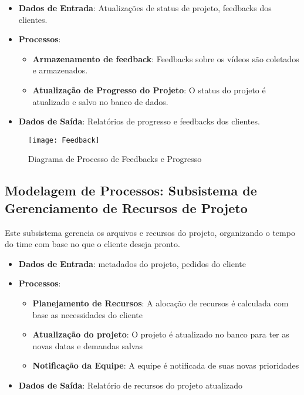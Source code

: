 \begin{itemize}
    \item \textbf{Dados de Entrada}: Atualizações de status de projeto, feedbacks dos clientes.
    \item \textbf{Processos}:
        \begin{itemize}
            \item \textbf{Armazenamento de feedback}: Feedbacks sobre os vídeos são coletados e armazenados.
            \item \textbf{Atualização de Progresso do Projeto}: O status do projeto é atualizado e salvo no banco de dados.
        \end{itemize}
    \item \textbf{Dados de Saída}: Relatórios de progresso e feedbacks dos clientes.
\end{itemize}

\begin{figure}[ht]
    \centering
    \texttt{[image: Feedback]}
    \caption{Diagrama de Processo de Feedbacks e Progresso}
    \label{fig:diagram1}
\end{figure}

\pagebreak
\newpage

\subsection{Modelagem de Processos: Subsistema de Gerenciamento de Recursos de Projeto}
Este subsistema gerencia os arquivos e recursos do projeto, organizando o tempo do time com base no que o cliente deseja pronto.

\begin{itemize}
    \item \textbf{Dados de Entrada}: metadados do projeto, pedidos do cliente
    \item \textbf{Processos}:
        \begin{itemize}
            \item \textbf{Planejamento de Recursos}: A alocação de recursos é calculada com base as necessidades do cliente
            \item \textbf{Atualização do projeto}: O projeto é atualizado no banco para ter as novas datas e demandas salvas
            \item \textbf{Notificação da Equipe}: A equipe é notificada de suas novas prioridades
        \end{itemize}
    \item \textbf{Dados de Saída}: Relatório de recursos do projeto atualizado
\end{itemize}

